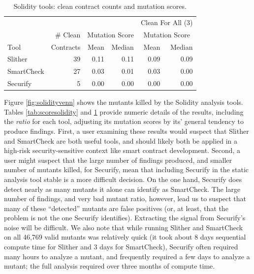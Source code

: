 \begin{table}
  \begin{tabular}{l|r|r|r|r|r}
    & & \multicolumn{2}{|c|}{} & \multicolumn{2}{|c}{Clean For All (3)} \\
    & \# Clean & \multicolumn{2}{|c|}{Mutation Score} &  \multicolumn{2}{|c}{Mutation Score}\\
    Tool & Contracts & Mean & Median & Mean & Median\\
    \hline
    \hline
    Slither & 39 & 0.11 & 0.11 & 0.09 & 0.09 \\
    \hline
    SmartCheck & 27 & 0.03 & 0.01 & 0.03 & 0.00 \\
    \hline
    Securify & 5 & 0.00 & 0.00 & 0.00 & 0.00 \\
    \hline
  \end{tabular}
  \caption{Solidity tools: clean contract counts and mutation scores.}
  \label{tab:cleansolidity}
\end{table}


Figure \ref{fig:solidityvenn} shows the mutants killed by the Solidity analysis tools.  Tables \ref{tab:scoresolidity} and \ref{tab:cleansolidity} provide numeric details of the results, including the \emph{ratio} for each tool, adjusting its mutation scores by its' general tendency to produce findings.  First, a user examining these results would suspect that Slither and SmartCheck are both useful tools, and should likely both be applied in a high-risk security-sensitive context like smart contract development.  Second, a user might suspect that the large number of findings produced, and smaller number of mutants killed, for Securify, mean that including Securify in the static analysis tool stable is a more difficult decision.  On the one hand, Securify does detect nearly as many mutants it alone can identify as SmartCheck.  The large number of findings, and very bad mutant ratio, however, lead us to suspect that many of these ``detected'' mutants are false positives (or, at least, that the problem is not the one Securify identifies).  Extracting the signal from Securify's noise will be difficult.  We also note that while running Slither and SmartCheck on all 46,769 valid mutants was relatively quick (it took about 8 days sequential compute time for Slither and 3 days for SmartCheck), Securify often required many hours to analyze a mutant, and frequently required a few days to analyze a mutant; the full analysis required over three months of compute time.

